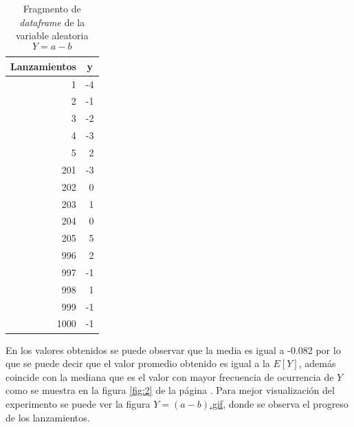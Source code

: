 \documentclass{article}
\begin{document}
\begin{table}[H]
  \centering
  \caption{Fragmento de \textit{dataframe} de la variable aleatoria $$Y = a - b$$ }
    \begin{tabular}{rr}
    \toprule
    \multicolumn{1}{l}{Lanzamientos} & \multicolumn{1}{c}{y} \\
    \midrule
    1     & -4 \\
    2     & -1 \\
    3     & -2 \\
    4     & -3 \\
    5     & 2 \\
    201   & -3 \\
    202   & 0 \\
    203   & 1 \\
    204   & 0 \\
    205   & 5 \\
    996   & 2 \\
    997   & -1 \\
    998   & 1 \\
    999   & -1 \\
    1000  & -1 \\
    \bottomrule
    \end{tabular}%
  \label{tab:r}%
\end{table}%
En los valores obtenidos se puede observar que la media es igual a -0.082 por lo que se puede decir que el valor promedio obtenido es igual a la $E[Y]$, además coincide con la mediana que es el valor con mayor frecuencia de ocurrencia de $Y$ como se muestra en la figura \ref{fig:2} de la página \pageref{fig:2}. Para mejor visualización del experimento se puede ver la figura  \href{https://github.com/Albertomnoa/Tareas_MPA/blob/master/Tarea10/gif/resta.gif}{$Y = (a - b)$.gif}, donde se observa el progreso de los lanzamientos.
\end{document}
